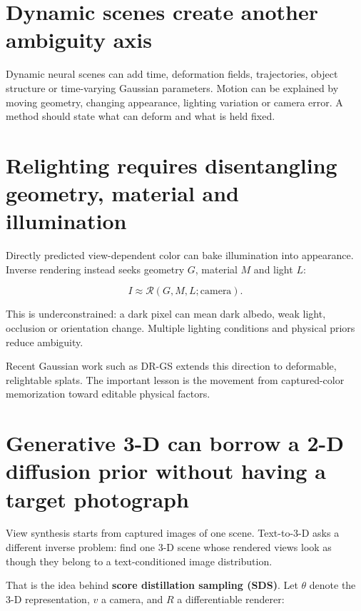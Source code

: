 \section{Dynamic scenes create another ambiguity axis}\label{04-visual-computing-ii-ch035-dynamic-scenes-create-another-ambiguity-axis}

Dynamic neural scenes can add time, deformation fields, trajectories, object structure or time-varying Gaussian parameters. Motion can be explained by moving geometry, changing appearance, lighting variation or camera error. A method should state what can deform and what is held fixed.

\section{Relighting requires disentangling geometry, material and illumination}\label{04-visual-computing-ii-ch035-relighting-requires-disentangling-geometry-material-and-illumination}

Directly predicted view-dependent color can bake illumination into appearance. Inverse rendering instead seeks geometry \(G\), material \(M\) and light \(L\):

\[
I\approx\mathcal R(G,M,L;\text{camera}).
\]

This is underconstrained: a dark pixel can mean dark albedo, weak light, occlusion or orientation change. Multiple lighting conditions and physical priors reduce ambiguity.

Recent Gaussian work such as DR-GS extends this direction to deformable, relightable splats. The important lesson is the movement from captured-color memorization toward editable physical factors.

\section{Generative 3-D can borrow a 2-D diffusion prior without having a target photograph}\label{04-visual-computing-ii-ch035-generative-3-d-can-borrow-a-2-d-diffusion-prior-without-having-a-target-photograph}

View synthesis starts from captured images of one scene. Text-to-3-D asks a different inverse problem: find one 3-D scene whose rendered views look as though they belong to a text-conditioned image distribution.

That is the idea behind \textbf{score distillation sampling (SDS)}. Let \(\theta\) denote the 3-D representation, \(v\) a camera, and \(R\) a differentiable renderer:

